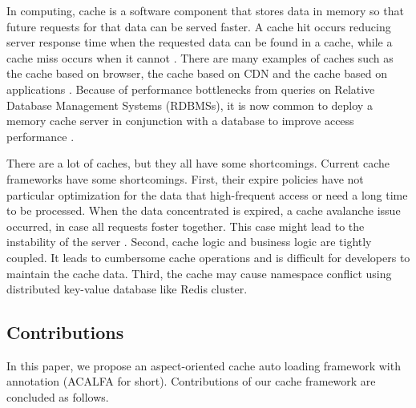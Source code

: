 \documentclass{singlecol-new}
\theoremstyle{TH}{
\newtheorem{lemma}{Lemma}
\newtheorem{theorem}[lemma]{Theorem}
\newtheorem{corrolary}[lemma]{Corrolary}
\newtheorem{conjecture}[lemma]{Conjecture}
\newtheorem{proposition}[lemma]{Proposition}
\newtheorem{claim}[lemma]{Claim}
\newtheorem{stheorem}[lemma]{Wrong Theorem}
}
\theoremstyle{THrm}{
\newtheorem{definition}{Definition}[section]
\newtheorem{question}{Question}[section]
\newtheorem{remark}{Remark}
\newtheorem{scheme}{Scheme}
}
\theoremstyle{THhit}{
\newtheorem{case}{Case}[section]
}
\begin{document}
In computing, cache is a software component that stores data in memory so that future requests for that data can be served faster. A cache hit occurs reducing server response time when the requested data can be found in a cache, while a cache miss occurs when it cannot \cite{ma2017segment}. There are many examples of caches such as the cache based on browser, the cache based on CDN \cite{manjhi2005finding} and the cache based on applications \cite{wu2011characterization}. Because of performance bottlenecks from queries on Relative Database Management Systems (RDBMSs), it is now common to deploy a memory cache server in conjunction with a database to improve access performance \cite{ma2017column}.

There are a lot of caches, but they all have some shortcomings. Current cache frameworks have some shortcomings. First, their expire policies have not particular optimization for the data that high-frequent access or need a long time to be processed. When the data concentrated is expired, a cache avalanche issue occurred, in case all requests foster together. This case might lead to the instability of the server \cite{ma2017column}. Second, cache logic and business logic are tightly coupled. It leads to cumbersome cache operations and is difficult for developers to maintain the cache data. Third, the cache may cause namespace conflict using distributed key-value database like Redis cluster.

\subsection{Contributions}
In this paper, we propose an aspect-oriented cache auto loading framework with annotation (ACALFA for short). Contributions of our cache framework are concluded as follows.
\end{document}
